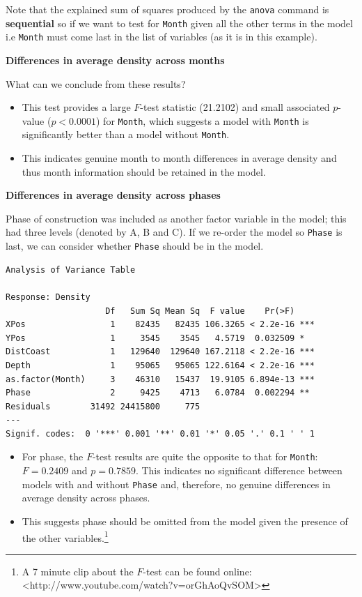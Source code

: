 \documentclass[
  oneside]{krantz}
\providecommand{\tightlist}{%
  \setlength{\itemsep}{0pt}\setlength{\parskip}{0pt}}
\begin{document}
Note that the explained sum of squares produced by the \texttt{anova} command is \textbf{sequential} so if we want to test for \texttt{Month} given all the other terms in the model i.e \texttt{Month} must come last in the list of variables (as it is in this example).

\textbf{Differences in average density across months}

What can we conclude from these results?

\begin{itemize}
\tightlist
\item
  This test provides a large \(F\)-test statistic (21.2102) and small associated \(p\)-value (\(p<0.0001\)) for \texttt{Month}, which suggests a model with \texttt{Month} is significantly better than a model without \texttt{Month}.
\item
  This indicates genuine month to month differences in average density and thus month information should be retained in the model.
\end{itemize}

\textbf{Differences in average density across phases}

Phase of construction was included as another factor variable in the model; this had three levels (denoted by A, B and C). If we re-order the model so \texttt{Phase} is last, we can consider whether \texttt{Phase} should be in the model.

\begin{verbatim}
Analysis of Variance Table

Response: Density
                    Df   Sum Sq Mean Sq  F value    Pr(>F)    
XPos                 1    82435   82435 106.3265 < 2.2e-16 ***
YPos                 1     3545    3545   4.5719  0.032509 *  
DistCoast            1   129640  129640 167.2118 < 2.2e-16 ***
Depth                1    95065   95065 122.6164 < 2.2e-16 ***
as.factor(Month)     3    46310   15437  19.9105 6.894e-13 ***
Phase                2     9425    4713   6.0784  0.002294 ** 
Residuals        31492 24415800     775                       
---
Signif. codes:  0 '***' 0.001 '**' 0.01 '*' 0.05 '.' 0.1 ' ' 1
\end{verbatim}

\begin{itemize}
\item
  For phase, the \(F\)-test results are quite the opposite to that for \texttt{Month}: \(F=0.2409\) and \(p=0.7859\). This indicates no significant difference between models with and without \texttt{Phase} and, therefore, no genuine differences in average density across phases.
\item
  This suggests phase should be omitted from the model given the presence of the other variables.\footnote{A 7 minute clip about the $F$-test can be found online: \newline <http://www.youtube.com/watch?v=orGhAoQvSOM>}
\end{itemize}
\end{document}
